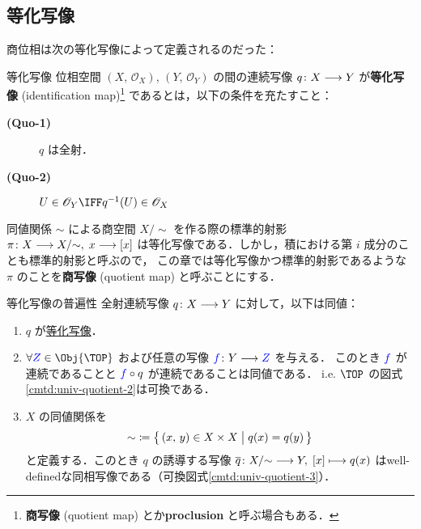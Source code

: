 \documentclass[algtopo_main]{subfiles}
\begin{document}
\subsection{等化写像}

商位相は次の等化写像によって定義されるのだった：
\begin{mydef}[label=def:quotient-map]{等化写像}
    位相空間 $(X,\, \mathscr{O}_X),\, (Y,\, \mathscr{O}_Y)$  の間の連続写像 $q \colon X \longrightarrow Y$ が\textbf{等化写像} (identification map)\footnote{\textbf{商写像} (quotient map) とか\textbf{proclusion} と呼ぶ場合もある．} であるとは，以下の条件を充たすこと：
    \begin{description}
        \item[\textbf{(Quo-1)}] $q$ は全射．
        \item[\textbf{(Quo-2)}] $U \in \mathscr{O}_Y \IFF q^{-1}(U) \in \mathscr{O}_X$
    \end{description}
\end{mydef}

\begin{marker}
    同値関係 $\sim$ による商空間 $X/{\sim}$ を作る際の標準的射影 $\pi \colon X \longrightarrow X/{\sim},\; x \longrightarrow [x]$ は等化写像である．しかし，積における第 $i$ 成分のことも標準的射影と呼ぶので，
    この章では等化写像かつ標準的射影であるような $\pi$ のことを\textbf{商写像} (quotient map) と呼ぶことにする．
\end{marker}


\begin{myprop}[label=prop:quotient-basic, breakable]{等化写像の普遍性}
    全射連続写像 $q \colon X \longrightarrow Y$ に対して，以下は同値：
    \begin{enumerate}
        \item $q$ が\hyperref[def:quotient-map]{等化写像}．
        \item $\forall\textcolor{blue}{Z} \in \Obj{\TOP}$ および任意の写像 $\textcolor{blue}{f} \colon Y \longrightarrow \textcolor{blue}{Z}$ を与える．
        このとき
        $\textcolor{blue}{f}$ が連続であることと $\textcolor{blue}{f}\circ q$ が連続であることは同値である．
        i.e. $\TOP$ の図式\ref{cmtd:univ-quotient-2}は可換である．
        \item $X$ の同値関係を
        \begin{align}
            {\sim} \coloneqq \bigl\{\, (x,\, y) \in X \times X \bigm| q(x) = q(y) \,\bigr\} 
        \end{align}
        と定義する．このとき $q$ の誘導する写像 $\overline{q} \colon X / {\sim} \longrightarrow Y,\; [x] \longmapsto q(x)$ はwell-definedな同相写像である（可換図式\ref{cmtd:univ-quotient-3}）．
    \end{enumerate}
\end{myprop}
\end{document}

